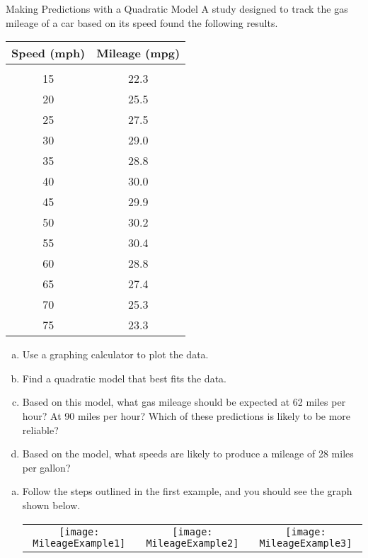 \begin{example}[https://www.youtube.com/watch?v=FemfjoeQ0hk&list=PLfmpjsIzhztutjEb8Pg5OBOlI1p80yVoy&index=7]{Making Predictions with a Quadratic Model}
A study designed to track the gas mileage of a car based on its speed found the following results.
\begin{center}
\begin{tabular}{c c}
\textbf{Speed (mph)} & \textbf{Mileage (mpg)}\\
\hline
& \\
15 & 22.3\\
20 & 25.5\\
25 & 27.5\\
30 & 29.0\\
35 & 28.8\\
40 & 30.0\\
45 & 29.9\\
50 & 30.2\\
55 & 30.4\\
60 & 28.8\\
65 & 27.4\\
70 & 25.3\\
75 & 23.3
\end{tabular}
\end{center}

\begin{enumerate}[(a)]
\item Use a graphing calculator to plot the data.
\item Find a quadratic model that best fits the data.
\item Based on this model, what gas mileage should be expected at 62 miles per hour?  At 90 miles per hour?  Which of these predictions is likely to be more reliable?
\item Based on the model, what speeds are likely to produce a mileage of 28 miles per gallon?
\end{enumerate}

\sol
\begin{enumerate}[(a)]
\item Follow the steps outlined in the first example, and you should see the graph shown below.
\begin{center}
\begin{tabular}{c c c}
\texttt{[image: MileageExample1]}
& \texttt{[image: MileageExample2]}
& \texttt{[image: MileageExample3]}
\end{tabular}
\end{center}


\end{enumerate}
\end{example}
